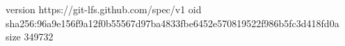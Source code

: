 version https://git-lfs.github.com/spec/v1
oid sha256:96a9e156f9a12f0b55567d97ba4833fbe6452e570819522f986b5fc3d418fd0a
size 349732
